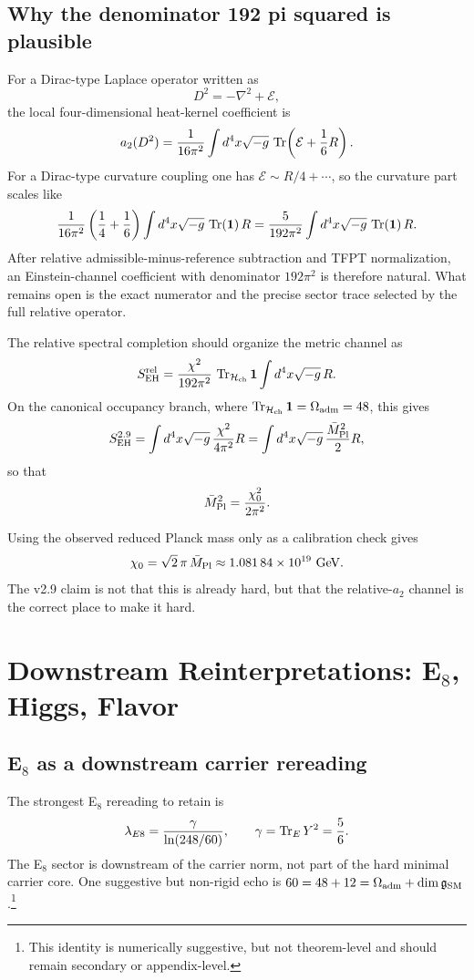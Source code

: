 \subsection{Why the denominator 192 pi squared is plausible}

For a Dirac-type Laplace operator written as
\[
D^2=-\nabla^2+\mathcal E,
\]
the local four-dimensional heat-kernel coefficient is
\[
a_2(D^2)=\frac{1}{16\pi^2}\int d^4x\sqrt{-g}\,
\operatorname{Tr}\!\left(\mathcal E+\frac16 R\right).
\]
For a Dirac-type curvature coupling one has $\mathcal E\sim R/4+\cdots$, so the curvature part scales like
\[
\frac{1}{16\pi^2}\left(\frac14+\frac16\right)
\int d^4x\sqrt{-g}\,\operatorname{Tr}(\mathbf 1)\,R
=
\frac{5}{192\pi^2}
\int d^4x\sqrt{-g}\,\operatorname{Tr}(\mathbf 1)\,R.
\]
After relative admissible-minus-reference subtraction and TFPT normalization, an Einstein-channel coefficient with denominator $192\pi^2$ is therefore natural. What remains open is the exact numerator and the precise sector trace selected by the full relative operator.

\begin{conjecture}
The relative spectral completion should organize the metric channel as
\[
S_{\mathrm{EH}}^{\mathrm{rel}}
=
\frac{\chi^2}{192\pi^2}\,\operatorname{Tr}_{\mathcal H_{\mathrm{ch}}}\mathbf 1
\int d^4x\sqrt{-g}\,R.
\]
On the canonical occupancy branch, where $\operatorname{Tr}_{\mathcal H_{\mathrm{ch}}}\mathbf 1=\Omega_{\mathrm{adm}}=48$, this gives
\[
S_{\mathrm{EH}}^{2.9}
= \int d^4x\sqrt{-g}\,\frac{\chi^2}{4\pi^2}R
= \int d^4x\sqrt{-g}\,\frac{\bar M_{\mathrm{Pl}}^2}{2}R,
\]
so that
\[
\bar M_{\mathrm{Pl}}^2=\frac{\chi_0^2}{2\pi^2}.
\]
\end{conjecture}

Using the observed reduced Planck mass only as a calibration check gives
\[
\chi_0 = \sqrt2\,\pi\,\bar M_{\mathrm{Pl}} \approx \num{1.08184e19}\ \mathrm{GeV}.
\]
The v2.9 claim is not that this is already hard, but that the relative-$a_2$ channel is the correct place to make it hard.

\section{Downstream Reinterpretations: \texorpdfstring{E$_8$}{E8}, Higgs, Flavor}

\subsection{\texorpdfstring{E$_8$}{E8} as a downstream carrier rereading}

The strongest E$_8$ rereading to retain is
\[
\lambda_{E8}=\frac{\gamma}{\ln(248/60)},
\qquad
\gamma=\operatorname{Tr}_EY^2=\frac56.
\]
The E$_8$ sector is downstream of the carrier norm, not part of the hard minimal carrier core. One suggestive but non-rigid echo is $60=48+12=\Omega_{\mathrm{adm}}+\dim\mathfrak g_{\mathrm{SM}}$.\footnote{This identity is numerically suggestive, but not theorem-level and should remain secondary or appendix-level.}

